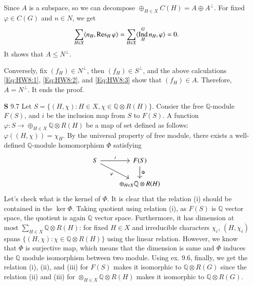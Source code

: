 \documentclass[a4paper, 12pt]{article}
\theoremstyle{Mydefinition}
\theoremstyle{Mytheorem}
\DeclareMathOperator{\Ind}{Ind}
\begin{document}
\begin{enumerate}
    Since $A$ is a subspace, so we can decompose $\oplus_{H\in X}C(H) = A\oplus A^\perp$. For fixed $\varphi\in C(G)$ and $n\in N$, we get
    \begin{equation}
        \sum_{H\in X}\langle n_H, \Res_H \varphi \rangle =\sum_{H\in X}\langle \Ind_H^G n_H, \varphi \rangle = 0.
    \end{equation}
    It shows that $A\leq N^\perp$.
    
    Conversely, fix $(f_H)\in N^\perp$, then $(f_H)\in S^\perp$, and the above calculations \eqref{Eq:HW8:1}, \eqref{Eq:HW8:2}, and \eqref{Eq:HW8:3} show that $(f_H)\in A$. Therefore, $A= N^\perp$. It ends the proof.
\end{enumerate}

\noindent \textbf{S} 9.7
Let $S = \{(H,\chi):H\in X,\chi\in \mathbb{Q}\otimes R(H)\}$. Consier the free $\mathbb{Q}$-module $F(S)$, and $i$ be the inclusion map from $S$ to $F(S)$. A function $\varphi:S\rightarrow \oplus_{H\in X} \mathbb{Q}\otimes R(H)$ be a map of set defined as follows: $\varphi((H, \chi)) = \chi_H$. By the universal property of free module, there exists a well-defined $\mathbb{Q}$-module homomorphism $\Phi$ satisfying
\[
  \begin{tikzcd}
    S \arrow{r}{i} \arrow[swap]{dr}{\varphi} & F(S) \arrow{d}{\Phi} \\
     & \oplus_{H\in X} \mathbb{Q}\otimes R(H)
  \end{tikzcd}
\]
Let's check what is the kernel of $\Phi$. It is clear that the relation (i) should be contained in the $\ker \Phi$. Taking quotient using relation (i), as $F(S)$ is $\mathbb{Q}$ vector space, the quotient is again $\mathbb{Q}$ vector space. Furthermore, it has dimension at most $\sum_{H\in X}\mathbb{Q}\otimes R(H)$: for fixed $H\in X$ and irreducible characters $\chi_i$, $(H,\chi_i)$ spans $\{(H,\chi):\chi\in\mathbb{Q}\otimes R(H)\}$ using the linear relation. However, we know that $\Phi$ is surjective map, which means that the dimension is same and $\Phi$ induces the $\mathbb{Q}$ module isomorphism between two module. Using ex. 9.6, finally, we get the relation (i), (ii), and (iii) for $F(S)$ makes it isomorphic to $\mathbb{Q}\otimes R(G)$ since the relation (ii) and (iii) for $\otimes_{H\in X}\mathbb{Q}\otimes R(H)$ makes it isomorphic to $\mathbb{Q}\otimes R(G)$.\\
\end{document}

